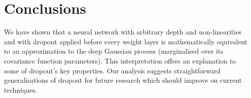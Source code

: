 \documentclass{article} %
\def\red#1{\textcolor{red}{#1}}
\theoremstyle{definition}
\begin{document}
\section{Conclusions}

We have shown that a neural network with arbitrary depth and non-linearities and with dropout applied before every weight layer is mathematically equivalent to an approximation to the deep Gaussian process (marginalised over its covariance function parameters). 
This interpretation offers an explanation to some of dropout's key properties. Our analysis suggests straightforward generalisations of dropout for future research which should improve on current techniques.

%
%







\newpage
\appendix
\end{document}
